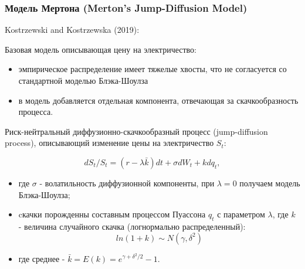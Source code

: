 \documentclass[c, dvipsnames]{beamer}  %
\begin{document}
\begin{frame}[shrink=5]
\frametitle{ Модель Мертона (Merton’s Jump-Diffusion Model) } 

\begin{block}{Kostrzewski and Kostrzewska (2019): }

Базовая модель описывающая цену на электричество: 

\footnotesize{
\begin{itemize}
	\item эмпирическое распределение имеет тяжелые хвосты, что не согласуется со стандартной моделью Блэка-Шоулза
	\item  в модель добавляется отдельная компонента, отвечающая за скачкообразность процесса. 
\end{itemize}
}

Риск-нейтральный диффузионно-скачкообразный процесс (jump-diffusion process), описывающий изменение цены на электричество $S_t$:

$$dS_t/S_t=(r−\lambda \bar{k})dt+\sigma dW_t+kdq_t,$$

\begin{itemize}
	\item где $\sigma$ - волатильность диффузионной компоненты, при  $\lambda=0$ получаем модель Блэка-Шоулза;
\item cкачки порожденны составным процессом Пуассона  $q_t$  с параметром  $\lambda$, где $k$  - величина случайного скачка (логнормально распределенный):    
$$ln(1 +k)\sim N(\gamma,\delta^2)$$
\item где среднее - $\bar{k} = E(k)=e^{\gamma + \delta^2/2}-1$.

\end{itemize}

\end{block}

\end{frame}
\end{document}
